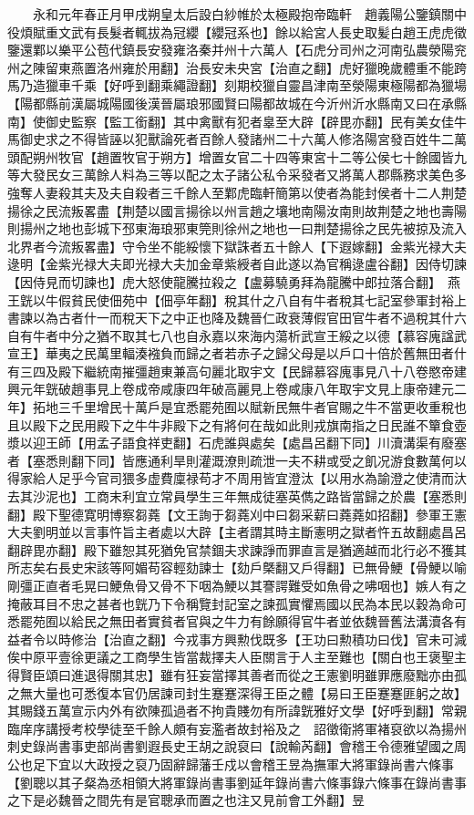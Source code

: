 　　永和元年春正月甲戌朔皇太后設白紗帷於太極殿抱帝臨軒　趙義陽公鑒鎮關中役煩賦重文武有長髮者輒拔為冠纓【纓冠系也】餘以給宮人長史取髪白趙王虎虎徵鑒還鄴以樂平公苞代鎮長安發雍洛秦并州十六萬人【石虎分司州之河南弘農滎陽兖州之陳留東燕置洛州雍於用翻】治長安未央宮【治直之翻】虎好獵晚歲體重不能跨馬乃造獵車千乘【好呼到翻乘繩證翻】刻期校獵自靈昌津南至滎陽東極陽都為獵場【陽都縣前漢屬城陽國後漢晉屬琅邪國賢曰陽都故城在今沂州沂水縣南又曰在承縣南】使御史監察【監工銜翻】其中禽獸有犯者辠至大辟【辟毘亦翻】民有美女佳牛馬御史求之不得皆誣以犯獸論死者百餘人發諸州二十六萬人修洛陽宮發百姓牛二萬頭配朔州牧官【趙置牧官于朔方】增置女官二十四等東宮十二等公侯七十餘國皆九等大發民女三萬餘人料為三等以配之太子諸公私令采發者又將萬人郡縣務求美色多強奪人妻殺其夫及夫自殺者三千餘人至鄴虎臨軒簡第以使者為能封侯者十二人荆楚揚徐之民流叛畧盡【荆楚以國言揚徐以州言趙之壤地南陽汝南則故荆楚之地也壽陽則揚州之地也彭城下邳東海琅邪東筦則徐州之地也一曰荆楚揚徐之民先被掠及流入北界者今流叛畧盡】守令坐不能綏懷下獄誅者五十餘人【下遐嫁翻】金紫光禄大夫逯明【金紫光禄大夫即光禄大夫加金章紫綬者自此遂以為官稱逯盧谷翻】因侍切諫【因侍見而切諫也】虎大怒使龍騰拉殺之【盧募驍勇拜為龍騰中郎拉落合翻】　燕王皝以牛假貧民使佃苑中【佃亭年翻】稅其什之八自有牛者稅其七記室參軍封裕上書諫以為古者什一而稅天下之中正也降及魏晉仁政衰薄假官田官牛者不過稅其什六自有牛者中分之猶不取其七八也自永嘉以來海内蕩析武宣王綏之以德【慕容廆諡武宣王】華夷之民萬里輻湊襁負而歸之者若赤子之歸父母是以戶口十倍於舊無田者什有三四及殿下繼統南摧彊趙東兼高句麗北取宇文【民歸慕容廆事見八十八卷愍帝建興元年皝破趙事見上卷成帝咸康四年破高麗見上卷咸康八年取宇文見上康帝建元二年】拓地三千里增民十萬戶是宜悉罷苑囿以賦新民無牛者官賜之牛不當更收重稅也且以殿下之民用殿下之牛牛非殿下之有將何在哉如此則戎旗南指之日民誰不簞食壺漿以迎王師【用孟子語食祥吏翻】石虎誰與處矣【處昌呂翻下同】川瀆溝渠有廢塞者【塞悉則翻下同】皆應通利旱則灌溉潦則疏泄一夫不耕或受之飢况游食數萬何以得家給人足乎今官司猥多虚費廩禄苟才不周用皆宜澄汰【以用水為諭澄之使清而汏去其沙泥也】工商末利宜立常員學生三年無成徒塞英儁之路皆當歸之於農【塞悉則翻】殿下聖德寛明博察芻蕘【文王詢于芻蕘刈中曰芻采薪曰蕘蕘如招翻】參軍王憲大夫劉明並以言事忤旨主者處以大辟【主者謂其時主斷憲明之獄者忤五故翻處昌呂翻辟毘亦翻】殿下雖恕其死猶免官禁錮夫求諫諍而罪直言是猶適越而北行必不獲其所志矣右長史宋該等阿媚苟容輕劾諫士【劾戶槩翻又戶得翻】已無骨鯁【骨鯁以喻剛彊正直者毛晃曰鯁魚骨又骨不下咽為鯁以其謇諤難受如魚骨之咈咽也】嫉人有之掩蔽耳目不忠之甚者也皝乃下令稱覽封記室之諫孤實懼焉國以民為本民以穀為命可悉罷苑囿以給民之無田者實貧者官與之牛力有餘願得官牛者並依魏晉舊法溝瀆各有益者令以時修治【治直之翻】今戎事方興勲伐既多【王功曰勲積功曰伐】官未可減俟中原平壹徐更議之工商學生皆當裁擇夫人臣關言于人主至難也【關白也王褒聖主得賢臣頌曰進退得關其忠】雖有狂妄當擇其善者而從之王憲劉明雖罪應廢黜亦由孤之無大量也可悉復本官仍居諫司封生蹇蹇深得王臣之體【易曰王臣蹇蹇匪躬之故】其賜錢五萬宣示内外有欲陳孤過者不拘貴賤勿有所諱皝雅好文學【好呼到翻】常親臨庠序講授考校學徒至千餘人頗有妄濫者故封裕及之　詔徵衛將軍褚裒欲以為揚州刺史錄尚書事吏部尚書劉遐長史王胡之說裒曰【說輸芮翻】會稽王令德雅望國之周公也足下宜以大政授之裒乃固辭歸藩壬戍以會稽王昱為撫軍大將軍錄尚書六條事【劉聰以其子粲為丞相領大將軍錄尚書事劉延年錄尚書六條事錄六條事在錄尚書事之下是必魏晉之間先有是官聰承而置之也注又見前會工外翻】昱